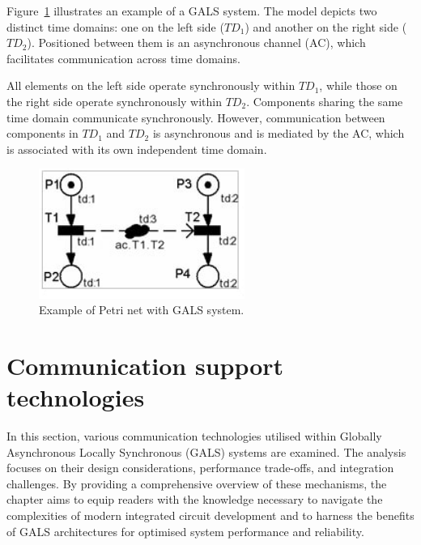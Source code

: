 Figure~\ref{fig:petrigals} illustrates an example of a GALS system. The model depicts two distinct time domains: one on the left side (\( TD_1 \)) and another on the right side (\( TD_2 \)). Positioned between them is an asynchronous channel (AC), which facilitates communication across time domains. 

All elements on the left side operate synchronously within \( TD_1 \), while those on the right side operate synchronously within \( TD_2 \). Components sharing the same time domain communicate synchronously. However, communication between components in \( TD_1 \) and \( TD_2 \) is asynchronous and is mediated by the AC, which is associated with its own independent time domain.




\begin{figure}[htbp]
  \centering
  \includegraphics[width=0.6\textwidth]{Chapters/Figures/petrigals.jpg}
  \caption{Example of Petri net with GALS system.}
  \label{fig:petrigals}
\end{figure}


%
%
%
%
%

\section{Communication support technologies}
\label{sec:communication_support_technologies}

In this section, various communication technologies utilised within Globally Asynchronous Locally Synchronous (GALS) systems are examined. The analysis focuses on their design considerations, performance trade-offs, and integration challenges. By providing a comprehensive overview of these mechanisms, the chapter aims to equip readers with the knowledge necessary to navigate the complexities of modern integrated circuit development and to harness the benefits of GALS architectures for optimised system performance and reliability.


